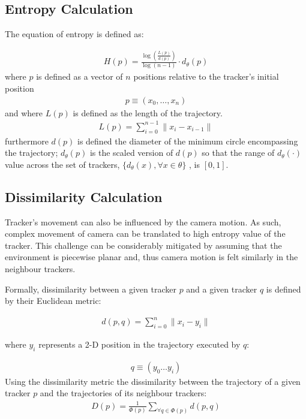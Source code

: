 \documentclass{article}
\begin{document}
\subsection{Entropy Calculation} 
 The equation of entropy is defined as:

\begin{align}
H(p) = \frac{\log(\frac{L(p)}{d(p)})}{\log(n-1)}\cdot d_\theta (p)
\end{align}
where $p$ is defined as a vector of $n$ positions relative to the tracker's initial position
\begin{align}
p \equiv (x_0,\ldots,x_n)
\end{align}
and where $L(p)$ is defined as the length of the trajectory.
\begin{align}
L(p) = \sum_{i=0}^{n-1} \| x_i - x_{i-1} \| 
\end{align}
furthermore $d(p)$ is defined the diameter of the minimum circle encompassing the trajectory; $d_\theta(p)$ is the scaled version of $d(p)$ so that the range of $d_\theta(\cdot)$ value across the set of trackers, $\{ d_\theta (x), \forall x \in \theta \}$ , is $[0,1]$.
\subsection{Dissimilarity Calculation} 
Tracker's movement can also be influenced by the camera motion. As such, complex movement of camera can be translated to high entropy value of the tracker. This challenge can be considerably mitigated by assuming that the environment is piecewise planar and, thus camera motion is felt similarly in the neighbour trackers. 

Formally, dissimilarity between a given tracker $p$ and a given tracker $q$ is defined by their Euclidean metric:

\begin{align}
d(p,q) = \sum_{i=0}^{n} \| x_i - y_i \| 
\end{align}

where $y_i$ represents a 2-D position in the trajectory executed by $q$:

\begin{align}
q \equiv (y_0 \ldots y_i)
\end{align}
Using the dissimilarity metric the dissimilarity between the trajectory of a given tracker $p$ and the trajectories of its neighbour trackers:
\begin{align}
D(p) = \frac{1}{\Phi (p)} \sum_{\forall q \in \Phi (p)} d (p,q)
\end{align}
\end{document}
